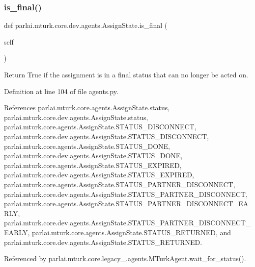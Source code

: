 \subsubsection{\texorpdfstring{is\+\_\+final()}{is\_final()}}
{\footnotesize\ttfamily def parlai.\+mturk.\+core.\+dev.\+agents.\+Assign\+State.\+is\+\_\+final (\begin{DoxyParamCaption}\item[{}]{self }\end{DoxyParamCaption})}

\begin{DoxyVerb}Return True if the assignment is in a final status that
can no longer be acted on.
\end{DoxyVerb}
 

Definition at line 104 of file agents.\+py.



References parlai.\+mturk.\+core.\+agents.\+Assign\+State.\+status, parlai.\+mturk.\+core.\+dev.\+agents.\+Assign\+State.\+status, parlai.\+mturk.\+core.\+agents.\+Assign\+State.\+S\+T\+A\+T\+U\+S\+\_\+\+D\+I\+S\+C\+O\+N\+N\+E\+CT, parlai.\+mturk.\+core.\+dev.\+agents.\+Assign\+State.\+S\+T\+A\+T\+U\+S\+\_\+\+D\+I\+S\+C\+O\+N\+N\+E\+CT, parlai.\+mturk.\+core.\+agents.\+Assign\+State.\+S\+T\+A\+T\+U\+S\+\_\+\+D\+O\+NE, parlai.\+mturk.\+core.\+dev.\+agents.\+Assign\+State.\+S\+T\+A\+T\+U\+S\+\_\+\+D\+O\+NE, parlai.\+mturk.\+core.\+agents.\+Assign\+State.\+S\+T\+A\+T\+U\+S\+\_\+\+E\+X\+P\+I\+R\+ED, parlai.\+mturk.\+core.\+dev.\+agents.\+Assign\+State.\+S\+T\+A\+T\+U\+S\+\_\+\+E\+X\+P\+I\+R\+ED, parlai.\+mturk.\+core.\+agents.\+Assign\+State.\+S\+T\+A\+T\+U\+S\+\_\+\+P\+A\+R\+T\+N\+E\+R\+\_\+\+D\+I\+S\+C\+O\+N\+N\+E\+CT, parlai.\+mturk.\+core.\+dev.\+agents.\+Assign\+State.\+S\+T\+A\+T\+U\+S\+\_\+\+P\+A\+R\+T\+N\+E\+R\+\_\+\+D\+I\+S\+C\+O\+N\+N\+E\+CT, parlai.\+mturk.\+core.\+agents.\+Assign\+State.\+S\+T\+A\+T\+U\+S\+\_\+\+P\+A\+R\+T\+N\+E\+R\+\_\+\+D\+I\+S\+C\+O\+N\+N\+E\+C\+T\+\_\+\+E\+A\+R\+LY, parlai.\+mturk.\+core.\+dev.\+agents.\+Assign\+State.\+S\+T\+A\+T\+U\+S\+\_\+\+P\+A\+R\+T\+N\+E\+R\+\_\+\+D\+I\+S\+C\+O\+N\+N\+E\+C\+T\+\_\+\+E\+A\+R\+LY, parlai.\+mturk.\+core.\+agents.\+Assign\+State.\+S\+T\+A\+T\+U\+S\+\_\+\+R\+E\+T\+U\+R\+N\+ED, and parlai.\+mturk.\+core.\+dev.\+agents.\+Assign\+State.\+S\+T\+A\+T\+U\+S\+\_\+\+R\+E\+T\+U\+R\+N\+ED.



Referenced by parlai.\+mturk.\+core.\+legacy\+\_.\+agents.\+M\+Turk\+Agent.\+wait\+\_\+for\+\_\+status().

